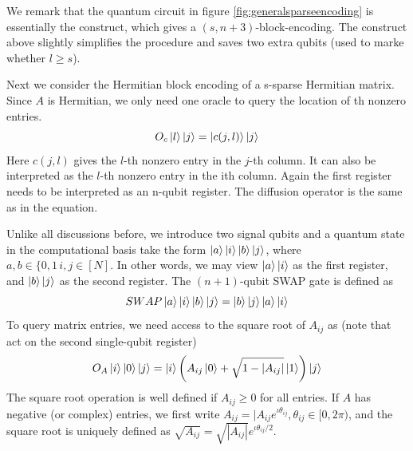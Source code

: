 \documentclass[12pt, oneside]{book}
\theoremstyle{definition}
\theoremstyle{definition}
\theoremstyle{remark}
\begin{document}
We remark that the quantum circuit in figure \ref{fig:generalsparseencoding} is essentially the construct, which gives a $(s,n+3)$-block-encoding. The construct above slightly simplifies the procedure and saves two extra qubits (used to marke whether $l\geq s$).

Next we consider the Hermitian block encoding of a s-sparse Hermitian matrix. Since $A$ is Hermitian, we only need one oracle to query the location of th nonzero entries.
\[
O_c\ket{l}\ket{j}=\ket{c(j,l)}\ket{j}
\]
Here $c(j,l)$ gives the $l$-th nonzero entry in the $j$-th column. It can also be interpreted as the $l$-th nonzero entry in the ith column. Again the first register needs to be interpreted as an n-qubit register. The diffusion operator is the same as in the equation.

Unlike all discussions before, we introduce two signal qubits and a quantum state in the computational basis take the form $\ket{a}\ket{i}\ket{b}\ket{j}$, where $a,b\in\{0,1\,i,j\in[N]$. In other words, we may view $\ket{a}\ket{i}$ as the first register, and $\ket{b}\ket{j}$ as the second register. The $(n+1)$-qubit SWAP gate is defined as
\[
SWAP\ket{a}\ket{i}\ket{b}\ket{j}=\ket{b}\ket{j}\ket{a}\ket{i}
\]
To query matrix entries, we need access to the square root of $A_{ij}$ as (note that act on the second single-qubit register)
\[
O_A\ket{i}\ket{0}\ket{j}=\ket{i}\left(A_{ij}\ket{0}+\sqrt{1-|A_{ij}|}\ket{1}\right)\ket{j}
\]
The square root operation is well defined if $A_{ij}\geq0$ for all entries. If $A$ has negative (or complex) entries, we first write $A_{ij}=|A_{ij}e^{\iota \theta_{ij}},\theta_{ij}\in[0,2\pi)$, and the square root is uniquely defined as $\sqrt{A_{ij}}=\sqrt{|A_{ij}|}e^{\iota\theta_{ij}/2}$.
\end{document}
